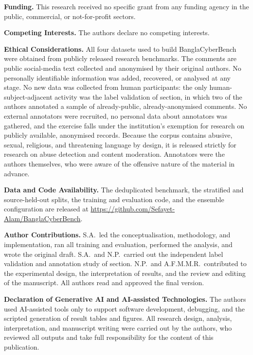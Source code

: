 \documentclass[11pt,a4paper]{article}
\def\cref#1{section}%
\newcommand{\bench}{BanglaCyberBench}
\begin{document}
\noindent\textbf{Funding.} This research received no specific grant from any funding agency in the public, commercial, or not-for-profit sectors.

\noindent\textbf{Competing Interests.} The authors declare no competing interests.

\noindent\textbf{Ethical Considerations.} All four datasets used to build \bench{} were obtained from publicly released research benchmarks. The comments are public social-media text collected and anonymised by their original authors. No personally identifiable information was added, recovered, or analysed at any stage. No new data was collected from human participants: the only human-subject-adjacent activity was the label validation of \cref{sec:taxonomy}, in which two of the authors annotated a sample of already-public, already-anonymised comments. No external annotators were recruited, no personal data about annotators was gathered, and the exercise falls under the institution's exemption for research on publicly available, anonymised records. Because the corpus contains abusive, sexual, religious, and threatening language by design, it is released strictly for research on abuse detection and content moderation. Annotators were the authors themselves, who were aware of the offensive nature of the material in advance.

\noindent\textbf{Data and Code Availability.} The deduplicated benchmark, the stratified and source-held-out splits, the training and evaluation code, and the ensemble configuration are released at \url{https://github.com/Sefayet-Alam/BanglaCyberBench}.

\noindent\textbf{Author Contributions.} S.A.\ led the conceptualisation, methodology, and implementation, ran all training and evaluation, performed the analysis, and wrote the original draft. S.A.\ and N.P.\ carried out the independent label validation and annotation study of \cref{sec:taxonomy}. N.P.\ and A.F.M.M.R.\ contributed to the experimental design, the interpretation of results, and the review and editing of the manuscript. All authors read and approved the final version.

\noindent\textbf{Declaration of Generative AI and AI-assisted Technologies.} The authors used AI-assisted tools only to support software development, debugging, and the scripted generation of result tables and figures. All research design, analysis, interpretation, and manuscript writing were carried out by the authors, who reviewed all outputs and take full responsibility for the content of this publication.

{\footnotesize
}
\end{document}
